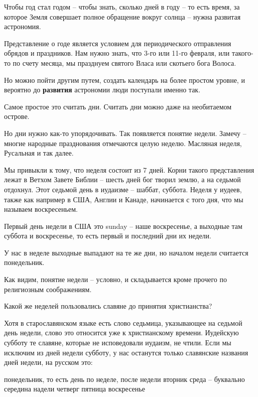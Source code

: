 \documentclass[a5paper,11pt,openany]{article}
\begin{document}
  Чтобы год стал годом – чтобы знать, сколько дней в году – то есть время, за которое Земля совершает полное обращение вокруг солнца – нужна развитая астрономия. 

   Представление о годе является условием для периодического отправления обрядов и праздников. Нам нужно знать, что 3-го или 11-го февраля, или такого-то по счету месяца, мы празднуем святого Власа или скотьего бога Волоса.

   Но можно пойти другим путем, создать календарь на более простом уровне, и вероятно до \textbf{развития} астрономии люди поступали именно так.

  Самое простое это считать дни. Считать дни можно даже на необитаемом острове.

    Но дни нужно как-то упорядочивать. Так появляется понятие недели. Замечу – многие народные празднования отмечаются целую неделю. Масляная неделя, Русальная и так далее.

Мы привыкли к тому, что неделя состоит из 7 дней. Корни такого представления лежат в Ветхом Завете Библии – шесть дней бог творил землю, а на седьмой отдохнул. Этот седьмой день в иудаизме – шаббат, суббота. Неделя у иудеев, также как например в США, Англии и Канаде, начинается с того дня, что мы называем воскресеньем. 


Первый день недели в США это sunday – наше воскресенье, а выходные там суббота и воскресенье, то есть первый и последний дни их недели.

У нас в неделе выходные выпадают на те же дни, но началом недели считается понедельник.

Как видим, понятие недели – условно, и складывается кроме прочего по религиозным соображениям.

Какой же неделей пользовались славяне до принятия христианства?

Хотя в старославянском языке есть слово седьмица, указывающее на седьмой день недели, слово это относится уже к христианскому времени. Иудейскую субботу те славяне, которые не исповедовали иудаизм, не чтили. Если мы исключим из дней недели субботу, у нас останутся только славянские названия дней недели, на русском это:\newline

\noindent понедельник, то есть день по неделе, после недели\newline
вторник\newline
среда – буквально середина надели\newline
четверг\newline
пятница\newline
воскресенье\newline
\end{document}
